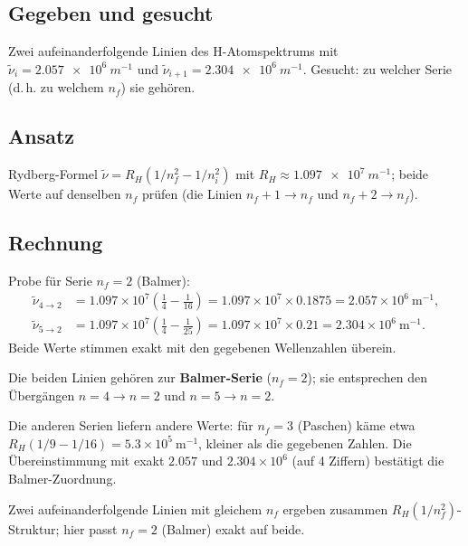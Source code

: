
\subsection*{Gegeben und gesucht}
Zwei aufeinanderfolgende Linien des H-Atomspektrums mit
$\tilde\nu_i = \qty{2.057e6}{m^{-1}}$ und
$\tilde\nu_{i+1} = \qty{2.304e6}{m^{-1}}$. Gesucht: zu welcher Serie (d.\,h.
zu welchem $n_f$) sie gehören.

\subsection*{Ansatz}
Rydberg-Formel $\tilde\nu = R_H(1/n_f^2 - 1/n_i^2)$ mit
$R_H \approx \qty{1.097e7}{m^{-1}}$; beide Werte auf denselben $n_f$
prüfen (die Linien $n_f{+}1\to n_f$ und $n_f{+}2\to n_f$).

\subsection*{Rechnung}
Probe für Serie $n_f = 2$ (Balmer):
\begin{align*}
  \tilde\nu_{4\to2} &= 1.097\times10^{7}
    \left(\frac14 - \frac{1}{16}\right)
  = 1.097\times10^{7}\times 0.1875
  = 2.057\times10^{6}\ \mathrm{m^{-1}}, \\[2pt]
  \tilde\nu_{5\to2} &= 1.097\times10^{7}
    \left(\frac14 - \frac{1}{25}\right)
  = 1.097\times10^{7}\times 0.21
  = 2.304\times10^{6}\ \mathrm{m^{-1}}.
\end{align*}
Beide Werte stimmen exakt mit den gegebenen Wellenzahlen überein.

\begin{ergebnis}
Die beiden Linien gehören zur \textbf{Balmer-Serie}
($n_f = 2$); sie entsprechen den Übergängen $n=4\to n=2$ und $n=5\to n=2$.
\end{ergebnis}

\begin{kontrolle}
Die anderen Serien liefern andere Werte: für $n_f=3$ (Paschen) käme etwa
$R_H(1/9-1/16) = 5.3\times10^{5}\ \mathrm{m^{-1}}$, kleiner als die
gegebenen Zahlen. Die Übereinstimmung mit exakt $2.057$ und $2.304\times10^{6}$
(auf 4 Ziffern) bestätigt die Balmer-Zuordnung.
\end{kontrolle}

\begin{merksatz}
Zwei aufeinanderfolgende Linien mit gleichem $n_f$ ergeben zusammen
$R_H(1/n_f^2)$-Struktur; hier passt $n_f=2$ (Balmer) exakt auf beide.
\end{merksatz}
